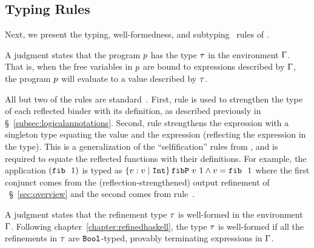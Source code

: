 \subsection{Typing Rules}

%
Next, we present the
typing, well-formedness, and subtyping~\citep{Knowles10,Vazou14}
rules of \corelan.

A judgment \hastype{\env}{\prog}{\typ} states that
the program $p$ has the type $\tau$ in
the environment $\Gamma$.
That is, when the free variables in $p$ are
bound to expressions described by $\Gamma$, the
program $p$ will evaluate to a value
described by $\tau$.

%
All but two of the rules are standard~\cite{Knowles10,Vazou14}.
%
First, rule \rtreflect is used to strengthen the type of each
reflected binder with its definition, as described previously
in \S~\ref{subsec:logicalannotations}.
%
Second, rule \rtexact strengthens the expression with
a singleton type equating the value and the expression
(\ie reflecting the expression in the type).
%
This is a generalization of the ``selfification'' rules
from \cite{Ou2004,Knowles10}, and is required to
equate the reflected functions with their definitions.
%
For example, the application $(\texttt{fib}\ {\ }1)$ is typed as
${\tref{v}{\tint}{\fibdef\ v\ 1 \wedge v = \fib\ 1}}$ where
the first conjunct comes from the (reflection-strengthened)
output refinement of \fib~\S~\ref{sec:overview} and
the second comes from rule~\rtexact.
%


A judgment \iswellformed{\env}{\typ} states that
the refinement type $\tau$ is well-formed in
the environment $\Gamma$.
%
Following chapter~\ref{chapter:refinedhaskell}, the type $\tau$ is well-formed if all
the refinements in $\tau$ are $\texttt{Bool}$-typed,
provably terminating expressions in $\Gamma$.
%


